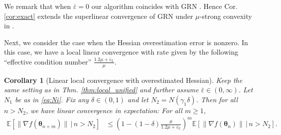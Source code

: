 \documentclass[11pt]{amsart}
\theoremstyle{plain}
\newtheorem{corollary}[theorem]{Corollary}
\theoremstyle{definition}
\theoremstyle{remark}
\def\E{\mathbb{E}}
\def\eps{\varepsilon}
\def\param{\boldsymbol{\theta}}
\newcommand{\commHL}[1]{{\textcolor{blue}{#1}}}
\begin{document}
We remark that when $\overline{\eps}=0$ our algorithm coincides with GRN \cite{mishchenko2023regularized}. Hence Cor. \ref{cor:exact} extends the superlinear convergence of GRN under $\mu$-strong convexity in \cite[Thm. 2]{mishchenko2023regularized}.



Next, we consider the case when the Hessian overestimation error is nonzero. In this case, we have a local linear convergence with rate given by the following ``effective condition number'' $\frac{1.2\mu + \overline{\eps}_{\E}}{\mu}$. 

\begin{corollary}[Linear local convergence with overestimated Hessian]\label{cor:inexact}
Keep the same setting as in Thm. \ref{thm:local_unified} and further assume $\bar{\eps}\in(0,\infty)$. %
Let $N_{1}$ be as in \eqref{eq:Ni}. Fix any $\delta \in (0,1)$ and let $N_{2}=N(\gamma_{1}\delta)$. Then  for all $n>N_{2}$, we have linear convergence in expectation: For all $m\ge 1$,
\begin{align*}
    \E[\|\nabla f(\param_{n+m})\| \,|\, n>N_{2}]&\leq \left(1-(1-\delta)\frac{\mu}{1.2\mu+\overline{\eps}_{\E}}\right)^{m}\E[\|\nabla f(\param_n)\| \,|\, n>N_{2}]. 
\end{align*}
\end{corollary}
\end{document}

